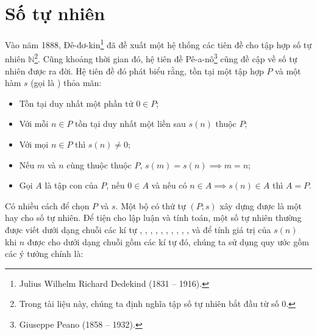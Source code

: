 \section{Số tự nhiên}

Vào năm 1888, Đê-đơ-kin\footnote{Julius Wilhelm Richard Dedekind (1831 -- 1916).} đã đề xuất một hệ thống các tiên đề cho tập hợp số tự nhiên $\mathbb{N}$\footnote{Trong tài liệu này, chúng ta định nghĩa tập số tự nhiên bắt đầu từ số $0$.}. Cũng khoảng thời gian đó, hệ tiên đề Pê-a-nô\footnote{Giuseppe Peano (1858 -- 1932).} cũng đề cập về số tự nhiên được ra đời. Hệ tiên đề đó phát biểu rằng, tồn tại một tập hợp $P$ và một hàm $s$ (gọi là ) thỏa mãn:
\begin{itemize}
   \item Tồn tại duy nhất một phần tử $0 \in P$;
   \item Với mỗi $n \in P$ tồn tại duy nhất một liền sau $s(n)$ thuộc $P$;
   \item Với mọi $n \in P$ thì $s(n) \neq 0$;
   \item Nếu $m$ và $n$ cùng thuộc thuộc $P$, $s(m) = s(n) \implies m = n$;
   \item Gọi $A$ là tập con của $P$, nếu $0 \in A$ và nếu có $n\in A \implies s(n) \in A$ thì $A = P$.
\end{itemize}
Có nhiều cách để chọn $P$ và $s$. Một bộ có thứ tự $(P; s)$ xây dựng được là một  hay  cho số tự nhiên. Để tiện cho lập luận và tính toán, một số tự nhiên thường được viết dưới dạng chuỗi các kí tự , , , , , , , , , , và để tính giá trị của $s(n)$ khi $n$ được cho dưới dạng chuỗi gồm các kí tự đó, chúng ta sử dụng quy ước gồm các ý tưởng chính là:
